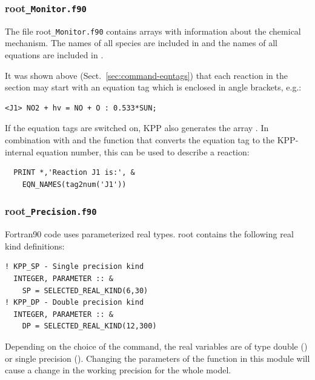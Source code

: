 \documentclass[twoside]{article}
\newcommand{\kpproot}{{\sc root}}
\begin{document}
\subsubsection{\kpproot{\tt\_Monitor.f90}}
\label{sec:output-monitor}

The file \kpproot{\tt\_Monitor.f90} contains  arrays
with information about the chemical mechanism. The names of all species
are included in  and the names of all equations are
included in .

It was shown above (Sect.~\ref{sec:command-eqntags}) that each reaction
in the  section may start with an equation tag which is
enclosed in angle brackets, e.g.:
%
\begin{verbatim}
<J1> NO2 + hv = NO + O : 0.533*SUN;
\end{verbatim}
%
If the equation tags are switched on, KPP also generates the
 array . In combination with
 and the function  that converts the
equation tag to the KPP-internal equation number, this can be used to
describe a reaction:
%
\begin{verbatim}
  PRINT *,'Reaction J1 is:', &
    EQN_NAMES(tag2num('J1'))
\end{verbatim}

\subsubsection{\kpproot{\tt\_Precision.f90}}
\label{sec:output-precision}

Fortran90 code uses parameterized real types.
\kpproot{} contains the following real kind
definitions:
%
\begin{verbatim}
! KPP_SP - Single precision kind
  INTEGER, PARAMETER :: &
    SP = SELECTED_REAL_KIND(6,30)
! KPP_DP - Double precision kind
  INTEGER, PARAMETER :: &
    DP = SELECTED_REAL_KIND(12,300)
\end{verbatim}
%
Depending on the choice of the  command, the real
variables are of type double () or single precision
(). Changing the parameters of the
 function in this module will cause a change in
the working precision for the whole model.
\end{document}

